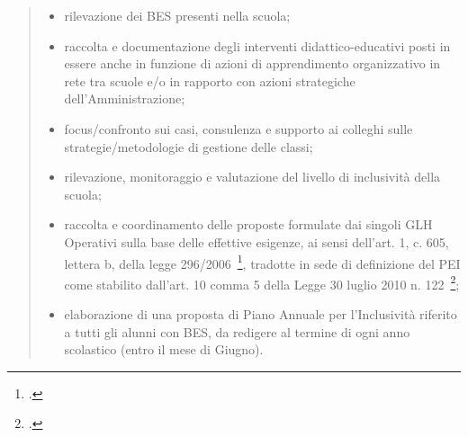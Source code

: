 \begin{quote}
	\begin{itemize}
		\item rilevazione dei BES presenti nella scuola;
		\item raccolta e documentazione degli interventi didattico-educativi posti in essere anche in
		funzione di azioni di apprendimento organizzativo in rete tra scuole e/o in rapporto con
		azioni strategiche dell'Amministrazione;
		\item focus/confronto sui casi, consulenza e supporto ai colleghi sulle strategie/metodologie di
		gestione delle classi;
		\item rilevazione, monitoraggio e valutazione del livello di inclusività della scuola;
		\item raccolta e coordinamento delle proposte formulate dai singoli GLH Operativi sulla base
		delle effettive esigenze, ai sensi dell’art. 1, c. 605, lettera b, della legge 296/2006~\footcite[b) il perseguimento della sostituzione del criterio previsto dall'articolo 40, comma 3, della legge 27 dicembre 1997, n. 449, con l'individuazione di organici corrispondenti alle effettive esigenze rilevate, tramite una stretta collaborazione tra regioni, uffici scolastici regionali, aziende sanitarie locali e istituzioni scolastiche, attraverso certificazioni idonee a definire appropriati interventi formativi;]{Legge_296_2006}, tradotte
		in sede di definizione del PEI come stabilito dall'art. 10 comma 5 della Legge 30 luglio
		2010 n. 122~\footcite[I soggetti di cui all'articolo 12, comma 5, della legge 5 febbraio 1992, n. 104 (GLH), in sede di formulazione del piano educativo individualizzato, elaborano proposte relative all'individuazione delle risorse necessarie, ivi compresa l'indicazione del numero delle ore di sostegno, che devono essere esclusivamente finalizzate all'educazione e all'istruzione, restando a carico degli altri soggetti istituzionali la fornitura delle altre risorse professionali e materiali necessarie per l'integrazione e l'assistenza dell'alunno disabile richieste dal piano educativo individualizzato]{Legge_122_2010};
		\item elaborazione di una proposta di Piano Annuale per l'Inclusività riferito a tutti gli alunni con BES, da redigere al termine di ogni anno scolastico (entro il mese di Giugno).
		

\end{itemize}
\end{quote}
